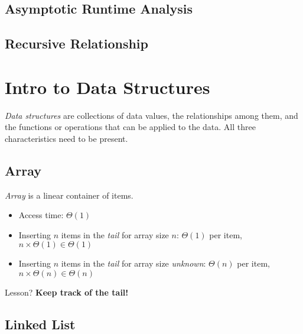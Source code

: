 \documentclass{report}
\begin{document}
\section{Asymptotic Runtime Analysis}

\section{Recursive Relationship}


\chapter{Intro to Data Structures}

\textit{Data structures} are collections of data values, the relationships among them, and the functions or operations that can be applied to the data. All three characteristics need to be present.

\section{Array}

\textit{Array} is a linear container of items.

\begin{center}
\end{center}

\begin{itemize}
  \item Access time: $\Theta (1)$
  \item Inserting $n$ items in the \textit{tail} for array size $n$: $\Theta(1)$ per item, $n \times \Theta(1) \in \Theta(1)$
  \item Inserting $n$ items in the \textit{tail} for array size \textit{unknown}: $\Theta(n)$ per item, $n \times \Theta(n) \in \Theta(n)$
\end{itemize}

Lesson? \textbf{Keep track of the tail!}

\section{Linked List}
\end{document}
